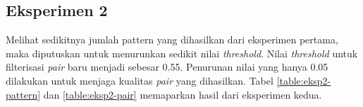 
\subsection{Eksperimen 2}
Melihat sedikitnya jumlah pattern yang dihasilkan dari eksperimen pertama, maka diputuskan untuk menurunkan sedikit nilai \textit{threshold}. Nilai \textit{threshold} untuk filterisasi \textit{pair} baru menjadi sebesar 0.55. Penurunan nilai yang hanya 0.05 dilakukan untuk menjaga kualitas \textit{pair} yang dihasilkan. Tabel \ref{table:eksp2-pattern} dan \ref{table:eksp2-pair} memaparkan hasil dari eksperimen kedua.

